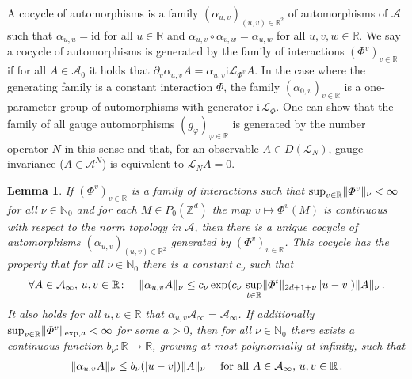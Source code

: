 \documentclass[a4paper]{article}
\renewcommand{\i}{\mathrm{i}}
\renewcommand{\Phi}{\varPhi}
\newcommand{\N}{\mathbb{N}}
\newcommand{\Z}{\mathbb{Z}}
\newcommand{\mA}{\mathcal{A}}
\newcommand{\R}{\mathbb{R}}
\newcommand{\mL}{\mathcal{L}}
\DeclarePairedDelimiter\norm{\lVert}{\rVert}
\theoremstyle{plain}
\newtheorem{lemma}[theorem]{Lemma}
\theoremstyle{definition}
\theoremstyle{remark}
\renewcommand{\(}{\left(}
\renewcommand{\)}{\right)}
\begin{document}
A cocycle of automorphisms is a family $(\alpha_{u,v})_{(u,v) \in \R^2}$ of automorphisms of $\mA$ such that $\alpha_{u,u} = \mathrm{id}$ for all $u\in \R$ and $\alpha_{u,v}\circ \alpha_{v,w} = \alpha_{u,w} $ for all $u,v,w\in \R$.
We say a cocycle of automorphisms is generated by the family of interactions $(\Phi^{v})_{v\in \R}$ if for all $A \in \mA_0$ it holds that $ \partial_v \alpha_{u,v} A = \alpha_{u,v} \i \mL_{\Phi^{v}} A$. In the case where the generating family is a constant interaction $\Phi$, the family $(\alpha_{0,v})_{v\in \R}$ is a one-parameter group of automorphisms with generator $\i\,\mL_{\Phi}$. One can show that the family of all gauge automorphisms $(g_\varphi)_{ \varphi \in \R}$ is generated by the number operator $N$ in this sense and that, for an observable $A\in D(\mL_N)$, gauge-invariance ($A\in \mA^N$) is equivalent to $\mL_N  A = 0$.



\medskip

\begin{lemma}\label{lem:cocycles}
    If $(\Phi^{v})_{v\in \R}$ is a family of interactions such that $\sup_{v\in \R} \norm{\Phi^{v}}_\nu < \infty $ for all $\nu\in \N_0$ and for each $M \in P_0(\Z^d)$ the map $ v \mapsto \Phi^{v}(M)$ is continuous with respect to the norm topology in $\mA$, then there is a unique cocycle of automorphisms $(\alpha_{u,v})_{(u,v) \in \R^2}$ generated by $(\Phi^{v})_{v\in \R}$.
    This cocycle has the property that for all $\nu\in \N_0$ there is a constant $c_\nu$ such that 
    \begin{align*}
        \forall A\in \mA_\infty,\, u,v\in \R\colon \quad\norm{\alpha_{u,v} A }_\nu \leq c_\nu \exp(c_\nu\, \sup_{t\in\R}\norm{\Phi^t}_{2d+1+\nu} \, |u-v|) \norm{A}_\nu   \, .
    \end{align*}
    It also holds for all $u,v\in \R$ that $\alpha_{u,v} \mA_\infty = \mA_\infty$.
    If additionally $\sup_{v\in \R} \norm{\Phi^{v}}_{\exp,a} < \infty $ for some $a > 0$, then for all $\nu \in \N_0$ there exists a continuous function $b_\nu:\R \to \R$, growing at most polynomially at infinity, such that
    \begin{align*}
        \norm{\alpha_{u,v} A}_\nu \leq b_\nu(|u-v|) \norm{A}_\nu \quad \text{ for all } A\in \mA_\infty,\, u,v\in \R \,.
    \end{align*}
\end{lemma}
\end{document}
